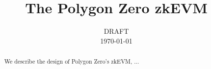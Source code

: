 \documentclass[12pt]{article}
\title{The Polygon Zero zkEVM}
\date{DRAFT\\\today}
\begin{document}
\maketitle

\begin{abstract}
  We describe the design of Polygon Zero's zkEVM, ...
\end{abstract}

\newpage
{\hypersetup{hidelinks} \tableofcontents}
\newpage








{}

\end{document}
